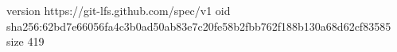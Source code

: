 version https://git-lfs.github.com/spec/v1
oid sha256:62bd7e66056fa4c3b0ad50ab83e7c20fe58b2fbb762f188b130a68d62cf83585
size 419
